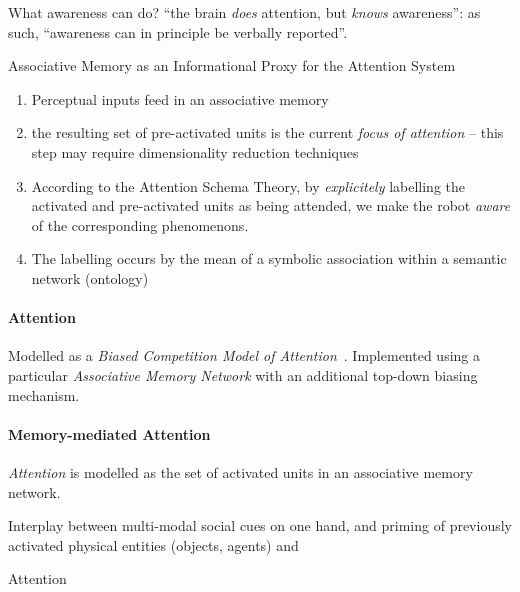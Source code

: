 \documentclass[a4paper]{article}
\begin{document}
What awareness can do? ``the brain \emph{does} attention, but \emph{knows}
awareness'': as such, ``awareness can in principle be verbally reported''.



Associative Memory as an Informational Proxy for the Attention System


\begin{enumerate}
    \item Perceptual inputs feed in an associative memory

    \item the resulting set of pre-activated units is the current
        \emph{focus of attention} -- this step may require dimensionality
        reduction techniques

    \item According to the Attention Schema Theory, by \emph{explicitely}
        labelling the activated and pre-activated units as being attended, we
        make the robot \emph{aware} of the corresponding phenomenons.

    \item The labelling occurs by the mean of a symbolic association within a
        semantic network (ontology)

\end{enumerate}

\paragraph{Attention}

Modelled as a \emph{Biased Competition Model of
Attention}~\cite{desimone1995neural}.
Implemented using a particular \emph{Associative Memory Network} with an
additional top-down biasing mechanism.

\paragraph{Memory-mediated Attention}

\emph{Attention} is modelled as the set of activated units in an associative
memory network.


Interplay between multi-modal social cues on one hand, and priming of previously activated physical
entities (objects, agents) and 

Attention
\end{document}
